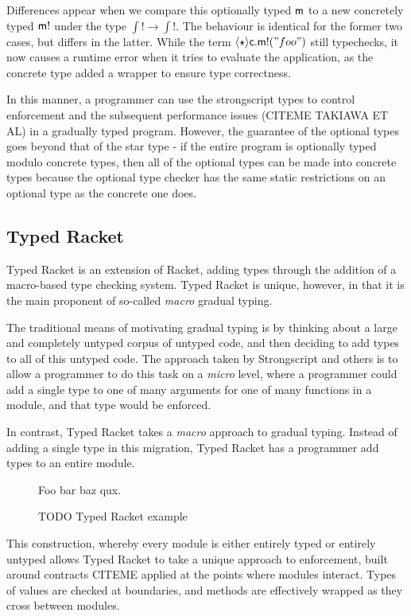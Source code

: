 \documentclass[preprint]{sigplanconf}
\newcommand{\m}{\M{\xt{m}}}
\newcommand{\Cast}[2]{\M{\langle{#1}\rangle{#2}}}
\newcommand{\any}{\M{\star}}
\newcommand{\M}[1]{\ensuremath{#1}\xspace}
\newcommand{\xt}[1]{{\sf{#1}}\xspace}
\begin{document}
Differences appear when we compare this optionally typed $\m$ to a new concretely
typed $\m\xt{!}$ under the type $\int! \rightarrow \int!$. The behaviour is 
identical for the former two cases, but differs in the latter. While the 
term $\Cast{\any}{\xt{c}}.\xt{\m!}("foo")$ still typechecks, it now causes a runtime
error when it tries to evaluate the application, as the concrete type added a wrapper
to ensure type correctness.

In this manner, a programmer can use the strongscript types to control enforcement
and the subsequent performance issues (CITEME TAKIAWA ET AL) in a gradually typed
program. However, the guarantee of the optional types goes beyond that of the 
star type - if the entire program is optionally typed modulo concrete types,
then all of the optional types can be made into concrete types because the optional
type checker has the same static restrictions on an optional type as the concrete 
one does.
\subsection{Typed Racket}

Typed Racket is an extension of Racket, adding types through the addition
of a macro-based type checking system. Typed Racket is unique, however, in
that it is the main proponent of so-called \emph{macro} gradual typing.

The traditional means of motivating gradual typing is by thinking about
a large and completely untyped corpus of untyped code, and then deciding
to add types to all of this untyped code. The approach taken by Strongscript
and others is to allow a programmer to do this task on a \emph{micro} level,
where a programmer could add a single type to one of many arguments for
one of many functions in a module, and that type would be enforced.

In contrast, Typed Racket takes a \emph{macro} approach to gradual typing.
Instead of adding a single type in this migration, Typed Racket has a programmer
add types to an entire module. 

\begin{figure}
Foo bar baz qux.
\caption{TODO Typed Racket example}
\end{figure}

This construction, whereby every module is either entirely typed or entirely untyped
allows Typed Racket to take a unique approach to enforcement, built around
contracts CITEME applied at the points where modules interact. Types of values are
checked at boundaries, and methods are effectively wrapped as they cross between modules.
\end{document}
